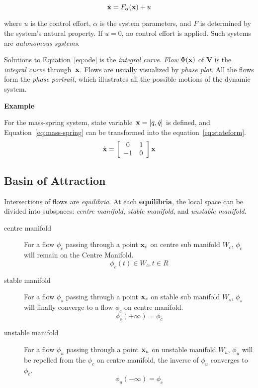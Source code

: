 \begin{equation}
\label{eq:ode}
\dot{\mathbf{x}}=F_{\alpha}(\mathbf{x})+u
\end{equation}



where $u$ is the control effort, 
$\alpha$ is the system parameters,
and $F$ is determined by the system's natural property.
If $u=0$,  no control effort is applied.
Such systems are \emph{autonomous systems}. 

Solutions to Equation~\ref{eq:ode} is the \emph{integral curve}. 
\emph{Flow} $\Phi(\mathbf{x})$ of $\mathbf{V}$ is the \emph{integral curve} through~$\mathbf{x}$. 
Flows are usually visualized by \emph{phase plot}.
All the flows form the \emph{phase portrait}, which illustrates all the possible motions of the dynamic system.


\textbf{Example}

For the mass-spring system, state variable~$\mathbf{x}=[q,\dot{q}]$ is defined, and Equation~\ref{eq:mass-spring} can be transformed into the equation~\ref{eq:stateform}.
\begin{equation}
\label{eq:stateform}
\dot{\mathbf{x}}=
\left[ 
\begin{array}{cc}
0 &1\\
-1 &0 
\end{array}
\right]\mathbf{x}
\end{equation}



\subsection{Basin of Attraction}
Intersections of flows are \emph{equilibria}.
At each \textbf{equilibria}, the local space can be divided into subspaces: 
\emph{centre manifold}, \emph{stable manifold}, and \emph{unstable manifold}.
\begin{description} 
\item[centre manifold]
For a flow $\phi_c$ passing through a point $\mathbf{x}_{c}$ on centre sub manifold $W_{c}$, $\phi_c$ will remain on the Centre Manifold. 
\[
\phi_{c}(t) \in W_{c}, t \in R
\]

\item [stable manifold]
For a flow $\phi_{s}$ passing through a point $\mathbf{x}_{s}$ on stable sub manifold $W_{s}$, $\phi_s$ will finally converge to a flow $\phi_c$ on centre manifold.
\[
\phi_{s}(+\infty)=\phi_{c}
\]
\item[unstable manifold]
For a flow $\phi_u$ passing through a point $\mathbf{x}_u$ on unstable manifold $W_{u}$, $\phi_u$ will be repelled from the $\phi_c$ on centre manifold, the inverse of $\phi_u$ converges to $\phi_c$. 
\[
\phi_{u}(-\infty)=\phi_{c}
\] 
\end{description}


